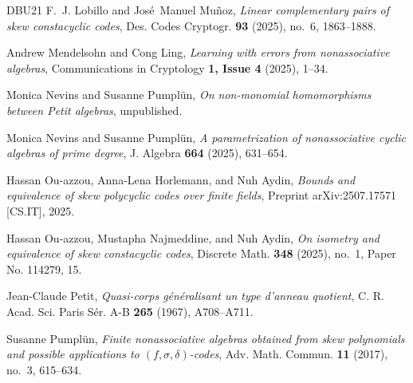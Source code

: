 \documentclass[11pt]{amsart}
\theoremstyle{plain}
\theoremstyle{definition}
\numberwithin{equation}{section}
\numberwithin{figure}{section}
\begin{document}
\begin{thebibliography}{DBU{\etalchar{+}}21}
F.~J. Lobillo and Jos\'e{}~Manuel Mu\~noz, \emph{Linear complementary pairs of skew constacyclic codes}, Des. Codes Cryptogr. \textbf{93} (2025), no.~6, 1863--1888. 

Andrew Mendelsohn and Cong Ling, \emph{Learning with errors from nonassociative algebras}, Communications in Cryptology \textbf{1, Issue 4} (2025), 1--34.

Monica Nevins and Susanne Pumpl\"un, \emph{On non-monomial homomorphisms between Petit algebras}, unpublished.

Monica Nevins and Susanne Pumpl\"un, \emph{A parametrization of nonassociative cyclic algebras of prime degree}, J. Algebra \textbf{664} (2025), 631--654. 

Hassan Ou-azzou, Anna-Lena Horlemann, and Nuh Aydin, \emph{Bounds and equivalence of skew polycyclic codes over finite fields}, Preprint arXiv:2507.17571 [CS.IT], 2025.

Hassan Ou-azzou, Mustapha Najmeddine, and Nuh Aydin, \emph{On isometry and equivalence of skew constacyclic codes}, Discrete Math. \textbf{348} (2025), no.~1, Paper No. 114279, 15. 

Jean-Claude Petit, \emph{Quasi-corps g\'en\'eralisant un type d'anneau quotient}, C. R. Acad. Sci. Paris S\'er. A-B \textbf{265} (1967), A708--A711. 



Susanne Pumpl\"un, \emph{Finite nonassociative algebras obtained from skew polynomials and possible applications to {$(f,\sigma,\delta)$}-codes}, Adv. Math. Commun. \textbf{11} (2017), no.~3, 615--634. 





\end{thebibliography}
\end{document}
